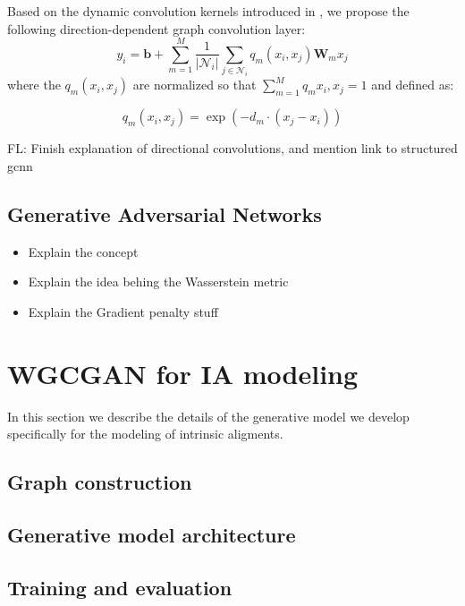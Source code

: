 \documentclass[a4paper,fleqn,usenatbib]{mnras}
\newcommand{\fl}[1]{{\color{magenta}FL: #1}}
\begin{document}
Based on the dynamic convolution kernels introduced in \cite{dynamic}, we propose the following direction-dependent graph convolution layer:
\begin{equation}
	y_i=  \mathbf{b} +  \sum\limits_{m=1}^{M} \frac{1}{|\mathcal{N}_i|} \sum_{j \in \mathcal{N}_i} q_m(x_i, x_j) \mathbf{W}_m x_j 
\end{equation}
where the  $q_m(x_i, x_j)$ are normalized so that $\sum_{m=1}^{M} q_m{x_i, x_j} = 1$ and defined as:

\begin{equation}
		q_m(x_i, x_j) = \exp(- d_m \cdot (x_j - x_i))
\end{equation}

\fl{Finish explanation of directional convolutions, and mention link to structured gcnn}


\subsection{Generative Adversarial Networks}

\begin{itemize}
	\item Explain the concept
	\item Explain the idea behing the Wasserstein metric
	\item Explain  the  Gradient penalty stuff
\end{itemize}


\section{WGCGAN for IA modeling}

In this section we describe the details of the generative model we develop specifically for the modeling of 
intrinsic aligments.




\subsection{Graph construction}


\subsection{Generative model architecture}

\subsection{Training and evaluation}
\end{document}
